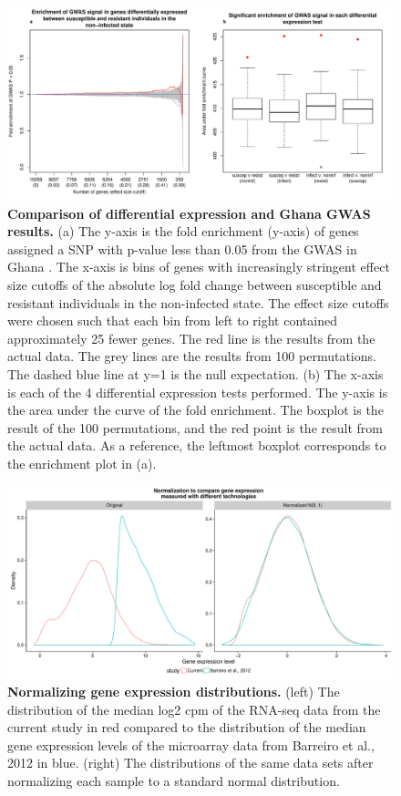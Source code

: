 \begin{figure}[ht]
\centering
\includegraphics[width=5in]{img/ch03/gwas-supp.pdf}
\caption[Comparison of differential expression and Ghana GWAS results.]{
\textbf{Comparison of differential expression and Ghana GWAS results.} (a) The
y-axis is the fold enrichment (y-axis) of genes assigned a SNP with
p-value less than 0.05 from the GWAS in Ghana \citep{Thye2010}. The
x-axis is bins of genes with increasingly stringent effect size
cutoffs of the absolute log fold change between susceptible and
resistant individuals in the non-infected state. The effect size
cutoffs were chosen such that each bin from left to right contained
approximately 25 fewer genes. The red line is the results from the
actual data. The grey lines are the results from 100 permutations. The
dashed blue line at y=1 is the null expectation. (b)  The x-axis is
each of the 4 differential expression tests performed. The y-axis is
the area under the curve of the fold enrichment. The boxplot is the
result of the 100 permutations, and the red point is the result from
the actual data. As a reference, the leftmost boxplot corresponds to
the enrichment plot in (a).
}
\label{fig:gwas-supp}
\end{figure}

\begin{figure}[ht]
\centering
\includegraphics[width=5in]{img/ch03/combined-distributions.pdf}
\caption[Normalizing gene expression distributions.]{
\textbf{Normalizing gene expression distributions.} (left) The distribution of
the median log2 cpm of the RNA-seq data from the current study in red
compared to the distribution of the median gene expression levels of
the microarray data from Barreiro et al., 2012 \citep{Barreiro2012} in
blue. (right) The distributions of the same data sets after
normalizing each sample to a standard normal distribution.
}
\label{fig:combined-dist}
\end{figure}

